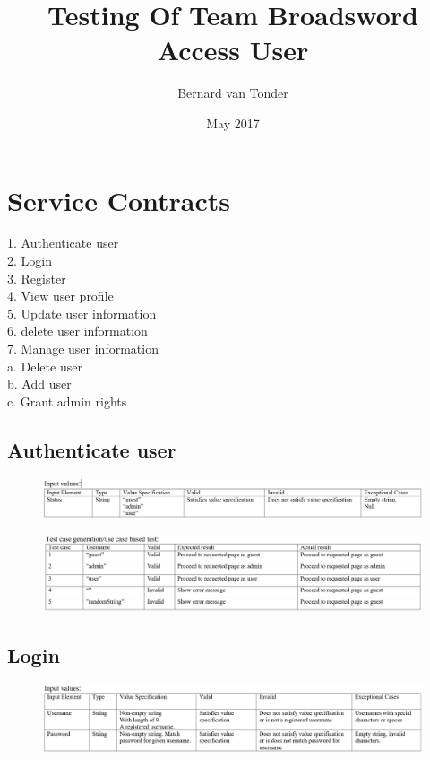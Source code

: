 \documentclass{article}
\title{Testing Of Team Broadsword Access User }
\author{Bernard van Tonder }
\date{May 2017}
\begin{document}
\maketitle

\section{Service Contracts}
1.	Authenticate user\\
2.	Login\\
3.	Register\\
4.	View user profile\\
5.	Update user information\\
6.	delete user information\\
7.	Manage user information\\
    a.	Delete user\\
    b.	Add user\\
    c.	Grant admin rights\\

\subsection{Authenticate user}
\begin{figure}[ht!]
\hspace*{-2.5cm} 
\includegraphics[width=180mm]{1.png}
\end{figure}

\begin{figure}[ht!]
\hspace*{-2.5cm} 
\includegraphics[width=180mm]{2.png}
\end{figure}

\subsection{Login}
\begin{figure}[ht!]
\hspace*{-2.5cm} 
\includegraphics[width=180mm]{3.png}
\end{figure}
\end{document}
